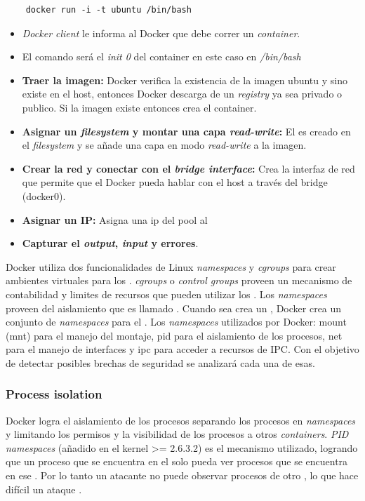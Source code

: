 \documentclass[letter,10pt]{article}
\begin{document}
\begin{verbatim}
	docker run -i -t ubuntu /bin/bash
\end{verbatim}
	\begin{itemize}
		\item \emph{Docker client} le informa al Docker que debe correr un \emph{container}.
		\item El comando será el \textit{init 0} del container en este caso en \emph{/bin/bash}
		\item \textbf{Traer la imagen:} Docker verifica la existencia de la imagen ubuntu y sino existe en el host, entonces Docker descarga de un \textit{registry} ya sea privado o publico. Si la imagen existe entonces crea el container.
		\item \textbf{Asignar un \emph{filesystem} y montar una capa \emph{read-write}:} El 
			\container es creado en el \emph{filesystem} y se añade una capa en modo 
			\emph{read-write} a la imagen.
		\item \textbf{Crear la red y conectar con el \emph{bridge interface}:} Crea la interfaz de red que permite que el Docker \container pueda hablar con el host a través del bridge (docker0).
		\item \textbf{Asignar un IP:} Asigna una ip del pool al \container
		\item \textbf{Capturar el \emph{output}, \emph{input} y errores}.
	\end{itemize}

Docker utiliza dos funcionalidades de Linux \emph{namespaces} y \emph{cgroups} para crear ambientes virtuales para los \containers. \emph{cgroups} o \emph{control groups} proveen un mecanismo de contabilidad y limites de recursos que pueden utilizar los \containers. \cite{bui2015analysis} Los \emph{namespaces} proveen del aislamiento que es llamado \container. Cuando sea crea un \container, Docker crea un conjunto de \emph{namespaces} para el \container. Los \emph{namespaces} utilizados por Docker: mount (mnt) para el manejo del montaje, pid para el aislamiento de los procesos, net para el manejo de interfaces y ipc para acceder a recursos de IPC. 
	Con el objetivo de detectar posibles brechas de seguridad se analizará cada una de esas.
	
	
	\subsubsection{Process isolation}
	
	Docker logra el aislamiento de los procesos separando los procesos en \emph{namespaces} y limitando los permisos y la visibilidad de los procesos a otros \emph{containers}. \emph{PID namespaces} (añadido en el kernel >= 2.6.3.2) es el mecanismo utilizado, logrando que un proceso que se encuentra en el \container solo pueda ver procesos que se encuentra en ese \container. Por lo tanto un atacante no puede observar procesos de otro \container, lo que hace difícil un ataque \cite{bui2015analysis} \cite{LVM:2015:Online}.
	
\end{document}
